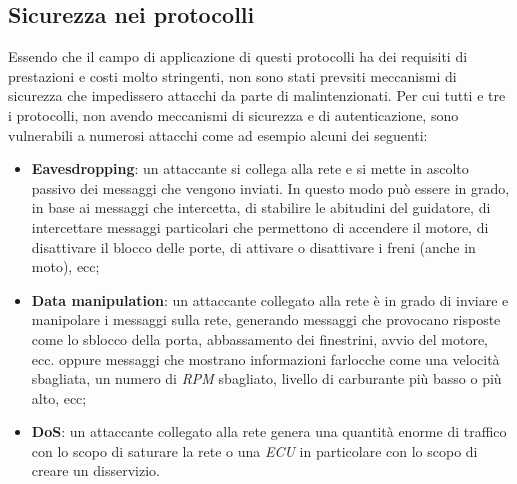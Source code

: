 \subsection{Sicurezza nei protocolli}
Essendo che il campo di applicazione di questi protocolli ha dei requisiti di prestazioni e costi molto stringenti, non sono stati prevsiti meccanismi di sicurezza che impedissero attacchi da parte di malintenzionati. Per cui tutti e tre i protocolli, non avendo meccanismi di sicurezza e di autenticazione, sono vulnerabili a numerosi attacchi come ad esempio alcuni dei seguenti:
\begin{itemize}
    \item \textbf{Eavesdropping}: un attaccante si collega alla rete e si mette in ascolto passivo dei messaggi che vengono inviati. In questo modo può essere in grado, in base ai messaggi che intercetta, di stabilire le abitudini del guidatore, di intercettare messaggi particolari che permettono di accendere il motore, di disattivare il blocco delle porte, di attivare o disattivare i freni (anche in moto), ecc;
    \item \textbf{Data manipulation}: un attaccante collegato alla rete è in grado di inviare e manipolare i messaggi sulla rete, generando messaggi che provocano risposte come lo sblocco della porta, abbassamento dei finestrini, avvio del motore, ecc. oppure messaggi che mostrano informazioni farlocche come una velocità sbagliata, un numero di \emph{RPM} sbagliato, livello di carburante più basso o più alto, ecc;
    \item \textbf{DoS}: un attaccante collegato alla rete genera una quantità enorme di traffico con lo scopo di saturare la rete o una \emph{ECU} in particolare con lo scopo di creare un disservizio. \cite{bozdal_samie_jennions_2018}
\end{itemize}

\newpage
